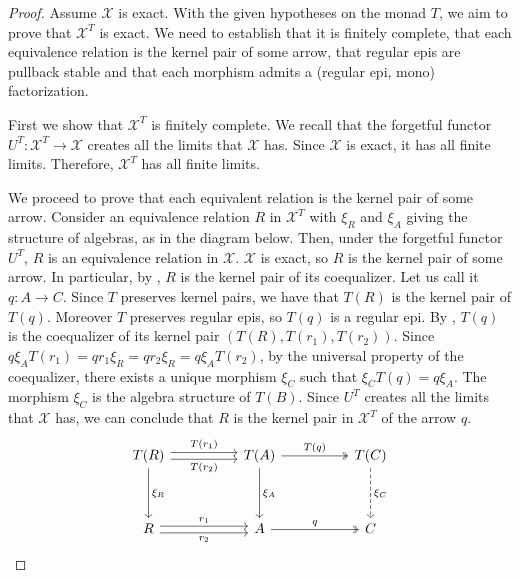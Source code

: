 \begin{subbox}{}
    \begin{proof}
        Assume $\mathcal{X}$ is exact. With the given hypotheses on the monad $T$, we aim to prove that $\mathcal{X}^T$ is exact. We need to establish that it is finitely complete, that each equivalence relation is the kernel pair of some arrow, that regular epis are pullback stable and that each morphism admits a (regular epi, mono) factorization.

        First we show that $\mathcal{X}^T$ is finitely complete. We recall that the forgetful functor $U^T:\mathcal{X}^T \to \mathcal{X}$ creates all the limits that $\mathcal{X}$ has. Since $\mathcal{X}$ is exact, it has all finite limits. Therefore, $\mathcal{X}^T$ has all finite limits.

        We proceed to prove that each equivalent relation is the kernel pair of some arrow. Consider an equivalence relation $R$ in $\mathcal{X}^T$ with $\xi_R$ and $\xi_A$ giving the structure of algebras, as in the diagram below. Then, under the forgetful functor $U^T$, $R$ is an equivalence relation in $\mathcal{X}$. $\mathcal{X}$ is exact, so $R$ is the kernel pair of some arrow. In particular, by , $R$ is the kernel pair of its coequalizer. Let us call it $q:A \to C$. Since $T$ preserves kernel pairs, we have that $T(R)$ is the kernel pair of $T(q)$. Moreover $T$ preserves regular epis, so $T(q)$ is a regular epi. By , $T(q)$ is the coequalizer of its kernel pair $(T(R),T(r_1),T(r_2))$. Since $q\xi_AT(r_1)= qr_1\xi_R = qr_2\xi_R=q\xi_AT(r_2)$, by the universal property of the coequalizer, there exists a unique morphism $\xi_C$ such that $\xi_CT(q) = q\xi_A$. The morphism $\xi_C$ is the algebra structure of $T(B)$. Since $U^T$ creates all the limits that $\mathcal{X}$ has, we can conclude that $R$ is the kernel pair in $\mathcal{X}^T$ of the arrow $q$.
        \[
\begin{tikzcd}
T(R) \arrow[dd, "\xi_R"] \arrow[rr, "T(r_1)", shift left] \arrow[rr, "T(r_2)"', shift right] &  & T(A) \arrow[dd, "\xi_A"] \arrow[rr, "T(q)", two heads] &  & T(C) \arrow[dd, "\xi_C", dashed] \\
                                                                                             &  &                                                        &  &                                  \\
R \arrow[rr, "r_1", shift left] \arrow[rr, "r_2"', shift right]                              &  & A \arrow[rr, "q", two heads]                           &  & C                               
\end{tikzcd}
    \]


\end{proof}
\end{subbox}
